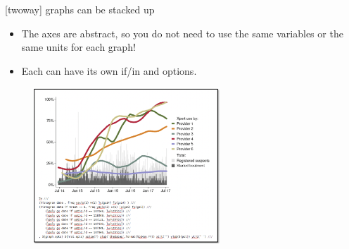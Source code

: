 \documentclass[aspectratio=169]{beamer}
\begin{document}
\begin{frame}{[twoway] graphs can be stacked up}
	\begin{multicols}{2}	
		
		\begin{itemize}[<default overlay specification>]
			\item<1> The axes are abstract, so you do not need to use the same variables or the same units for each graph!
			\item<1> Each can have its own if/in and options.
		\end{itemize}
		
		\begin{figure}
			\centering
			\includegraphics[width=70mm]{img/Graph3}
		\end{figure}
		
	\end{multicols}
\end{frame}
\end{document}
